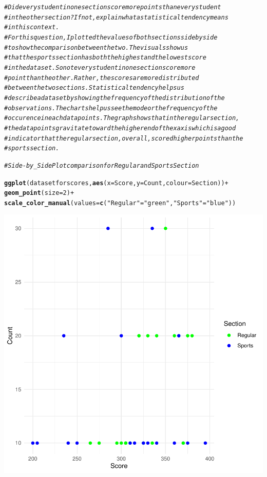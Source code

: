 \documentclass{article}\usepackage[]{graphicx}\usepackage[]{xcolor}
\makeatletter
\newcommand{\hlnum}[1]{\textcolor[rgb]{0.686,0.059,0.569}{#1}}%
\newcommand{\hlstr}[1]{\textcolor[rgb]{0.192,0.494,0.8}{#1}}%
\newcommand{\hlcom}[1]{\textcolor[rgb]{0.678,0.584,0.686}{\textit{#1}}}%
\newcommand{\hlopt}[1]{\textcolor[rgb]{0,0,0}{#1}}%
\newcommand{\hlstd}[1]{\textcolor[rgb]{0.345,0.345,0.345}{#1}}%
\newcommand{\hlkwc}[1]{\textcolor[rgb]{0.333,0.667,0.333}{#1}}%
\newcommand{\hlkwd}[1]{\textcolor[rgb]{0.737,0.353,0.396}{\textbf{#1}}}%
\newenvironment{kframe}{%
 \def\at@end@of@kframe{}%
 \ifinner\ifhmode%
  \def\at@end@of@kframe{\end{minipage}}%
  \begin{minipage}{\columnwidth}%
 \fi\fi%
 \def\FrameCommand##1{\hskip\@totalleftmargin \hskip-\fboxsep
 \colorbox{shadecolor}{##1}\hskip-\fboxsep
     \hskip-\linewidth \hskip-\@totalleftmargin \hskip\columnwidth}%
 \MakeFramed {\advance\hsize-\width
   \@totalleftmargin\z@ \linewidth\hsize
   \@setminipage}}%
 {\par\unskip\endMakeFramed%
 \at@end@of@kframe}
\newenvironment{knitrout}{}{} %
\makeatother
\begin{document}
\begin{knitrout}
\begin{kframe}
\begin{alltt}
\hlcom{# Did every student in one section score more points than every student }
\hlcom{# in the other section? If not, explain what a statistical tendency means }
\hlcom{# in this context.}
\hlcom{# For this question, I plotted the values of both sections side by side}
\hlcom{# to show the comparison between the two. The visuals show us}
\hlcom{# that the sports section has both the highest and the lowest score}
\hlcom{# in the dataset. So not every student in one section score more}
\hlcom{# point than the other. Rather, the scores are more distributed}
\hlcom{# between the two sections. Statistical tendency helps us}
\hlcom{# describe a dataset by showing the frequency of the distribution of the}
\hlcom{# observations. The charts help us see the mode or the frequency of the}
\hlcom{# occurence in each data points. The graph shows that in the regular section,}
\hlcom{# the data points gravitate toward the higher end of the x axis which is a good}
\hlcom{# indicator that the regular section, overall, scored higher points than the }
\hlcom{# sports section.}

\hlcom{#Side-by_Side Plot comparison for Regular and Sports Section}

\hlkwd{ggplot}\hlstd{(datasetforscores,} \hlkwd{aes}\hlstd{(}\hlkwc{x}\hlstd{=Score,}\hlkwc{y}\hlstd{=Count,}\hlkwc{colour}\hlstd{=Section))} \hlopt{+}
  \hlkwd{geom_point}\hlstd{(}\hlkwc{size} \hlstd{=} \hlnum{2}\hlstd{)} \hlopt{+}
  \hlkwd{scale_color_manual}\hlstd{(}\hlkwc{values} \hlstd{=} \hlkwd{c}\hlstd{(}\hlstr{"Regular"}\hlstd{=}\hlstr{"green"}\hlstd{,}\hlstr{"Sports"}\hlstd{=}\hlstr{"blue"}\hlstd{))}
\end{alltt}
\end{kframe}

{\centering \includegraphics[width=.6\linewidth]{figure/week4-assignment-01-Couto-Maria-Rnwauto-report-5} 

}
\end{knitrout}
\end{document}
